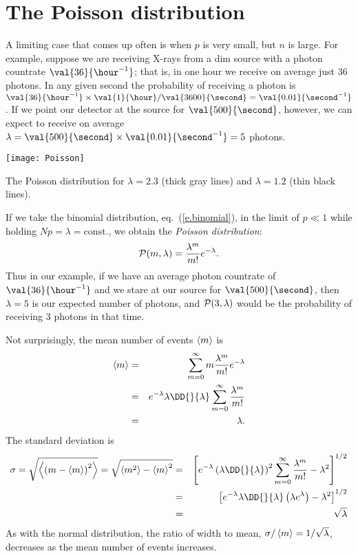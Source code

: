 \section{The Poisson distribution}

A limiting case that comes up often is when $p$ is very small, but $n$ is large.  For example, suppose we are receiving X-rays from a dim source with a photon countrate $\val{36}{\hour^{-1}}$; that is, in one hour we receive on average just 36 photons.  In any given second the probability of receiving a photon is $\val{36}{\hour^{-1}}\times \val{1}{\hour}/\val{3600}{\second} = \val{0.01}{\second^{-1}}$.  If we point our detector at the source for $\val{500}{\second}$, however, we can expect to receive on average $\lambda = \val{500}{\second}\times\val{0.01}{\second^{-1}} = 5$ photons.

\begin{marginfigure}
\texttt{[image: Poisson]}
\caption[The Poisson distribution ]{The Poisson distribution for $\lambda=2.3$ (thick gray lines) and $\lambda=1.2$ (thin black lines).}
\label{f.Poisson}
\end{marginfigure}


If we take the binomial distribution, eq.~(\ref{e.binomial}), in the limit of $p\ll 1$ while holding $Np=\lambda=\mathrm{const.}$, we obtain the \emph{Poisson distribution}:
\begin{equation}\label{e.Poisson}
	\mathcal{P}(m,\lambda) = \frac{\lambda^{m}}{m!}e^{-\lambda}.
\end{equation}
Thus in our example, if we have an average photon countrate of $\val{36}{\hour^{-1}}$ and we stare at our source for $\val{500}{\second}$, then $\lambda = 5$ is our expected number of photons, and $\mathcal{P}(3,\lambda)$ would be the probability of receiving 3 photons in that time.

Not surprisingly, the mean number of events $\left\langle m\right\rangle$ is
\begin{eqnarray*}
	\mean{m} &=& \sum_{m=0}^{\infty} m \frac{\lambda^{m}}{m!}e^{-\lambda}\\
		&=& e^{-\lambda} \lambda \DD{}{\lambda}\sum_{m=0}^{\infty} \frac{\lambda^{m}}{m!}\\
		&=& \lambda.
\end{eqnarray*}
The standard deviation is
\begin{eqnarray*}
	\sigma = \sqrt{\mean{\left(m-\mean{m}\right)^{2}}} = \sqrt{\mean{m^{2}}-\mean{m}^{2}}
		&=& \left[e^{-\lambda}\left(\lambda\DD{}{\lambda}\right)^{2}\sum_{m=0}^{\infty}\frac{\lambda^{m}}{m!}-\lambda^{2}\right]^{1/2}\\
		&=& \left[e^{-\lambda}\lambda\DD{}{\lambda}\left(\lambda e^{\lambda}\right)-\lambda^{2}\right]^{1/2}\\
		&=& \sqrt{\lambda}
\end{eqnarray*}
As with the normal distribution, the ratio of width to mean, $\sigma/\left\langle m\right\rangle = 1/\sqrt{\lambda}$, decreases as the mean number of events increases.  


